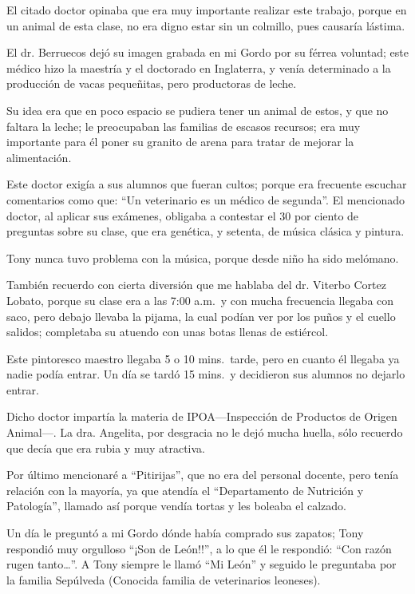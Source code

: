 \documentclass[letterpaper, 12pt]{book}
\begin{document}
El  citado doctor opinaba que era muy importante realizar este trabajo, porque en un animal de esta clase, no era digno estar sin un colmillo, pues causaría lástima.

El dr. Berruecos dejó su imagen grabada en mi Gordo por su férrea voluntad; este médico hizo la maestría y el doctorado en Inglaterra, y venía determinado a la producción de vacas pequeñitas, pero productoras de leche. 

Su idea era que en poco espacio se pudiera tener un animal de estos, y que no faltara la leche; le preocupaban las familias de escasos recursos; era muy importante para él poner su granito de arena para tratar de mejorar la alimentación.

Este doctor exigía a sus alumnos que fueran cultos; porque era frecuente escuchar comentarios como que: ``Un veterinario es un médico de segunda''.
El mencionado doctor, al aplicar sus exámenes, obligaba a contestar el 30 por ciento de preguntas sobre su clase, que era genética, y setenta, de música clásica y pintura.

Tony nunca tuvo problema con la música, porque desde niño ha sido melómano. 

También recuerdo con cierta diversión que me hablaba del dr. Viterbo Cortez Lobato, porque su clase era a las 7:00 a.m.\ y con mucha frecuencia llegaba con saco, pero debajo llevaba la pijama, la cual podían  ver por los puños y el cuello salidos; completaba su atuendo con unas botas llenas de estiércol.

Este pintoresco maestro llegaba 5 o 10 mins.\ tarde, pero en cuanto él llegaba ya nadie podía entrar. Un día se tardó 15 mins.\ y decidieron sus alumnos no dejarlo entrar. 

Dicho doctor impartía la materia de IPOA---Inspección de Productos de Origen Animal---.
La dra. Angelita, por desgracia no le dejó mucha huella, sólo recuerdo que decía que era rubia y muy atractiva. 

Por último mencionaré a ``Pitirijas'', que no era del personal docente, pero tenía relación con la mayoría, ya que atendía el ``Departamento de Nutrición y Patología'', llamado así porque vendía tortas y les boleaba el calzado.

Un día le preguntó a mi Gordo dónde había comprado sus zapatos; Tony respondió muy orgulloso ``¡Son de León!!'', a lo que él le respondió:
``Con razón rugen tanto\ldots''.  A Tony siempre le llamó ``Mi León'' y seguido le preguntaba por la familia Sepúlveda (Conocida familia de veterinarios leoneses).
\end{document}
